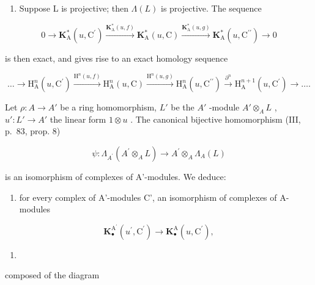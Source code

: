 \begin{enumerate}
\def\labelenumi{\alph{enumi})}
\setcounter{enumi}{1}
\tightlist
\item
  Suppose L is projective; then \(\Lambda(L)\) is projective. The sequence
\end{enumerate}

\[
0 \rightarrow \mathbf {K} _ {\mathrm{A}} ^ {*} (u, \mathrm{C} ^ {\prime}) \xrightarrow {\mathbf {K} _ {\mathrm{A}} ^ {*} (u , f)} \mathbf {K} _ {\mathrm{A}} ^ {*} (u, \mathrm{C}) \xrightarrow {\mathbf {K} _ {\mathrm{A}} ^ {*} (u , g)} \mathbf {K} _ {\mathrm{A}} ^ {*} (u, \mathrm{C} ^ {\prime \prime}) \rightarrow 0
\]

is then exact, and gives rise to an exact homology sequence

\[
\dots \rightarrow \mathrm{H} _ {\mathrm{A}} ^ {n} (u, \mathrm{C} ^ {\prime}) \xrightarrow {\mathrm{H} ^ {n} (u , f)} \mathrm{H} _ {\mathrm{A}} ^ {n} (u, \mathrm{C}) \xrightarrow {\mathrm{H} ^ {n} (u , g)} \mathrm{H} _ {\mathrm{A}} ^ {n} (u, \mathrm{C} ^ {\prime \prime}) \xrightarrow {\partial^ {n}} \mathrm{H} _ {\mathrm{A}} ^ {n + 1} (u, \mathrm{C} ^ {\prime}) \rightarrow \dots .
\]

Let \(\rho: A \to A'\) be a ring homomorphism, \(L'\) be the \(A'\) -module \(A' \otimes_A L\) , \(u': L' \to A'\) the linear form \(1 \otimes u\) . The canonical bijective homomorphism (III, p.~83, prop. 8)

\[
\psi : \Lambda_ {A ^ {\prime}} (A ^ {\prime} \otimes_ {A} L) \rightarrow A ^ {\prime} \otimes_ {A} \Lambda_ {A} (L)
\]

is an isomorphism of complexes of A'-modules. We deduce:

\begin{enumerate}
\def\labelenumi{\arabic{enumi})}
\tightlist
\item
  for every complex of A'-modules C', an isomorphism of complexes of A-modules
\end{enumerate}

\[
\mathbf {K} _ {\bullet} ^ {\mathrm{A} ^ {\prime}} \left(u ^ {\prime}, \mathrm{C} ^ {\prime}\right)\rightarrow \mathbf {K} _ {\bullet} ^ {\mathrm{A}} \left(u, \mathrm{C} ^ {\prime}\right),
\]

\begin{enumerate}
\def\labelenumi{(\arabic{enumi})}
\setcounter{enumi}{8}
\tightlist
\item
\end{enumerate}

composed of the diagram

